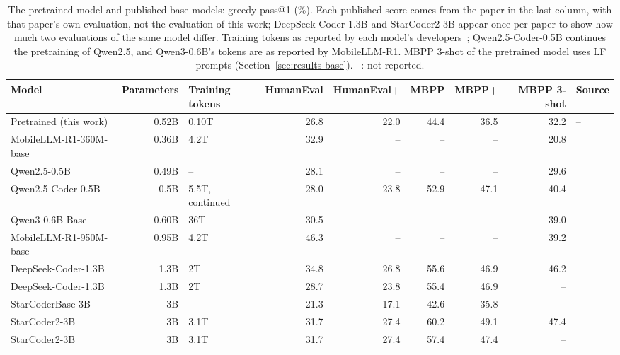 \documentclass[sigconf,nonacm,balance=false]{acmart}
\begin{document}
\begin{table}
  \caption{The pretrained model and published base models: greedy pass@1 (\%). Each published score comes from the
  paper in the last column, with that paper's own evaluation, not the evaluation of this work; DeepSeek-Coder-1.3B and
  StarCoder2-3B appear once per paper to show how much two evaluations of the same model differ. Training tokens as
  reported by each model's developers~\cite{guo2024deepseekcoder,hui2024qwen25coder,lozhkov2024starcoder2,
  zhao2025mobilellmr1}; Qwen2.5-Coder-0.5B continues the pretraining of Qwen2.5, and Qwen3-0.6B's tokens are as
  reported by MobileLLM-R1. MBPP 3-shot of the pretrained model uses LF prompts (Section~\ref{sec:results-base}).
  --: not reported.}
  \label{tab:published}
  \small
  \setlength{\tabcolsep}{4pt}
  \begin{tabular}{lrlrrrrrl}
    \toprule
    Model & Parameters & Training tokens & HumanEval & HumanEval+ & MBPP & MBPP+ & MBPP 3-shot & Source \\
    \midrule
    Pretrained (this work) & 0.52B & 0.10T & 26.8 & 22.0 & 44.4 & 36.5 & 32.2 & -- \\
    \midrule
    MobileLLM-R1-360M-base & 0.36B & 4.2T & 32.9 & -- & -- & -- & 20.8 & \cite{zhao2025mobilellmr1} \\
    Qwen2.5-0.5B & 0.49B & -- & 28.1 & -- & -- & -- & 29.6 & \cite{zhao2025mobilellmr1} \\
    Qwen2.5-Coder-0.5B & 0.5B & 5.5T, continued & 28.0 & 23.8 & 52.9 & 47.1 & 40.4 & \cite{hui2024qwen25coder} \\
    Qwen3-0.6B-Base & 0.60B & 36T & 30.5 & -- & -- & -- & 39.0 & \cite{zhao2025mobilellmr1} \\
    MobileLLM-R1-950M-base & 0.95B & 4.2T & 46.3 & -- & -- & -- & 39.2 & \cite{zhao2025mobilellmr1} \\
    DeepSeek-Coder-1.3B & 1.3B & 2T & 34.8 & 26.8 & 55.6 & 46.9 & 46.2 & \cite{hui2024qwen25coder} \\
    DeepSeek-Coder-1.3B & 1.3B & 2T & 28.7 & 23.8 & 55.4 & 46.9 & -- & \cite{lozhkov2024starcoder2} \\
    StarCoderBase-3B & 3B & -- & 21.3 & 17.1 & 42.6 & 35.8 & -- & \cite{lozhkov2024starcoder2} \\
    StarCoder2-3B & 3B & 3.1T & 31.7 & 27.4 & 60.2 & 49.1 & 47.4 & \cite{hui2024qwen25coder} \\
    StarCoder2-3B & 3B & 3.1T & 31.7 & 27.4 & 57.4 & 47.4 & -- & \cite{lozhkov2024starcoder2} \\
    \bottomrule
  \end{tabular}
\end{table}
\end{document}

